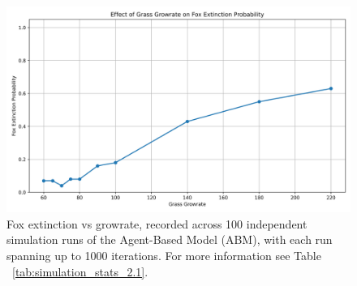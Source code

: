 \begin{figure}[!ht]
  \centering
  \includegraphics[width=0.9\linewidth]{images/fox_extinction_vs_growrate_100.png}
  \caption{
    Fox extinction vs growrate, recorded across 100 independent simulation runs of the Agent-Based Model (ABM), with each run spanning up to 1000 iterations. For more information see Table ~\ref{tab:simulation_stats_2.1}.
}
  \label{fig:fox_extinction_vs_growrate_100_2.1}
\end{figure}